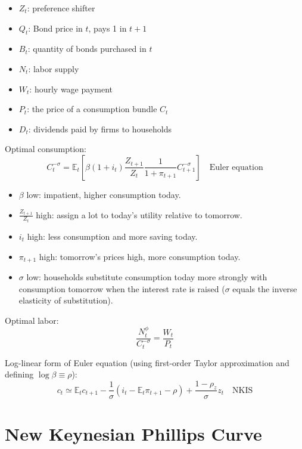 \documentclass{article}
\begin{document}
\begin{itemize}
    \item $Z_t$: preference shifter
    \item $Q_t$: Bond price in $t$, pays 1 in $t+1$
    \item $B_t$: quantity of bonds purchased in $t$
    \item $N_t$: labor supply
    \item $W_t$: hourly wage payment
    \item $P_t$: the price of a consumption bundle $C_t$
    \item $D_t$: dividends paid by firms to households
\end{itemize}

Optimal consumption:
\begin{equation*}
    C_t^{-\sigma}=\mathbb{E}_t\left[
    \beta(1+i_t)\frac{Z_{t+1}}{Z_t}\frac{1}{1+\pi_{t+1}}C_{t+1}^{-\sigma} 
    \right] \quad
    \textrm{Euler equation}
\end{equation*}

\begin{itemize}
    \item $\beta$ low: impatient, higher consumption today.
    \item $\frac{Z_{t+1}}{Z_t}$ high: assign a lot to today's utility relative to tomorrow.
    \item $i_t$ high: less consumption and more saving today.
    \item $\pi_{t+1}$ high: tomorrow's prices high, more consumption today.
    \item $\sigma$ low: households substitute consumption today more strongly with consumption tomorrow when the interest rate is raised ($\sigma$ equals the inverse elasticity of substitution).
\end{itemize}

Optimal labor:
\begin{equation*}
    \frac{N_t^{\phi}}{C_t^{-\sigma}}=\frac{W_t}{P_t}
\end{equation*}

Log-linear form of Euler equation (using first-order Taylor approximation and defining $\log\beta\equiv\rho$):
\begin{equation*}
    c_t\simeq \mathbb{E}_tc_{t+1} - \frac{1}{\sigma}(i_t-\mathbb{E}_t\pi_{t+1}-\rho)+\frac{1-\rho_z}{\sigma}z_t \quad
    \textrm{NKIS}
\end{equation*}

\section{New Keynesian Phillips Curve}
\end{document}
